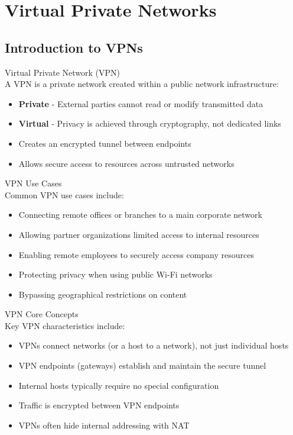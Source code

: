 \section{Virtual Private Networks}

\subsection{Introduction to VPNs}

\begin{definition}{Virtual Private Network (VPN)}\\
A VPN is a private network created within a public network infrastructure:
\begin{itemize}
    \item \textbf{Private} - External parties cannot read or modify transmitted data
    \item \textbf{Virtual} - Privacy is achieved through cryptography, not dedicated links
    \item Creates an encrypted tunnel between endpoints
    \item Allows secure access to resources across untrusted networks
\end{itemize}
\end{definition}

\begin{concept}{VPN Use Cases}\\
Common VPN use cases include:
\begin{itemize}
    \item Connecting remote offices or branches to a main corporate network
    \item Allowing partner organizations limited access to internal resources
    \item Enabling remote employees to securely access company resources
    \item Protecting privacy when using public Wi-Fi networks
    \item Bypassing geographical restrictions on content
\end{itemize}
\end{concept}

\begin{theorem}{VPN Core Concepts}\\
Key VPN characteristics include:
\begin{itemize}
    \item VPNs connect networks (or a host to a network), not just individual hosts
    \item VPN endpoints (gateways) establish and maintain the secure tunnel
    \item Internal hosts typically require no special configuration
    \item Traffic is encrypted between VPN endpoints
    \item VPNs often hide internal addressing with NAT
\end{itemize}
\end{theorem}

